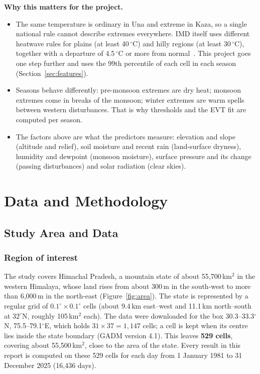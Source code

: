 \documentclass[12pt,a4paper]{report}
\begin{document}
\textbf{Why this matters for the project.}
\begin{itemize}
\item The same temperature is ordinary in Una and extreme in Kaza, so a single national rule cannot describe extremes
everywhere. IMD itself uses different heatwave rules for plains (at least 40\,$^\circ$C) and hilly regions (at least
30\,$^\circ$C), together with a departure of 4.5\,$^\circ$C or more from normal~\cite{imdheatdef}. This project goes
one step further and uses the 99th percentile of each cell in each season (Section~\ref{sec:features}).
\item Seasons behave differently: pre-monsoon extremes are dry heat; monsoon extremes come in breaks of the monsoon;
winter extremes are warm spells between western disturbances. That is why thresholds and the EVT fit are computed per
season.
\item The factors above are what the predictors measure: elevation and slope (altitude and relief), soil moisture and
recent rain (land-surface dryness), humidity and dewpoint (monsoon moisture), surface pressure and its change
(passing disturbances) and solar radiation (clear skies).
\end{itemize}

\chapter{Data and Methodology}
\label{ch:method}
\section{Study Area and Data}
\subsection{Region of interest}
The study covers Himachal Pradesh, a mountain state of about 55{,}700\,km$^2$ in the western Himalaya, whose land rises
from about 300\,m in the south-west to more than 6{,}000\,m in the north-east (Figure~\ref{fig:area}). The state is
represented by a regular grid of $0.1^\circ\times0.1^\circ$ cells (about 9.4\,km east--west and 11.1\,km north--south
at $32^\circ$N, roughly 105\,km$^2$ each). The data were downloaded for the box 30.3--33.3$^\circ$N,
75.5--79.1$^\circ$E, which holds $31\times37=1{,}147$ cells; a cell is kept when its centre lies inside the state
boundary (GADM version 4.1). This leaves \textbf{529 cells}, covering about 55{,}500\,km$^2$, close to the area of the
state. Every result in this report is computed on these 529 cells for each day from 1 January 1981 to 31 December
2025 (16{,}436 days).
\end{document}
